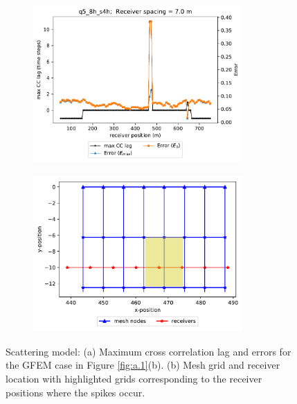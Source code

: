 \begin{figure}[h!]
 		\centering
		\begin{subfigure}{8cm}
				\includegraphics[width=8cm, height=6cm]{Thesis_Edith/figures/scattering/appendix/spike7.pdf}
			     \caption{}
		\end{subfigure}
        \hspace{0.25cm}
		\begin{subfigure}{8cm}
				\includegraphics[width=8cm, height=6cm]{Thesis_Edith/figures/scattering/appendix/receiver-spacing1_v2.pdf}
			   \caption{}
		\end{subfigure}
 
	\caption{Scattering model: (a) Maximum cross correlation lag and errors for the GFEM case in Figure \ref{fig:a.1}(b). (b) Mesh grid and receiver location with highlighted grids corresponding to the receiver positions where the spikes occur.}  
	\label{fig:a.2}
\end{figure}

